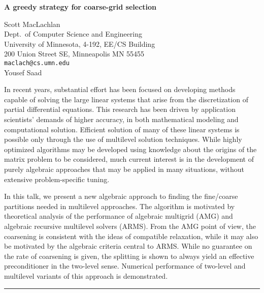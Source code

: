 \documentclass[twosided]{report}
\begin{document}
\begin{center}
{\large			%
{\bf A greedy strategy for coarse-grid selection}}

	Scott MacLachlan \\
	Dept.~of Computer Science and Engineering \\
	University of Minnesota, 4-192, EE/CS Building \\
	200 Union Street SE, Minneapolis MN 55455 \\
	{\tt maclach@cs.umn.edu} \\
	Yousef Saad
\end{center}
In recent years, substantial effort has been focused on
developing methods capable of solving the large linear
systems that arise from the discretization of partial
differential equations. This research has been driven by
application scientists' demands of higher accuracy, in both
mathematical modeling and computational solution. Efficient
solution of many of these linear systems is possible only
through the use of multilevel solution techniques. While
highly optimized algorithms may be developed using knowledge
about the origins of the matrix problem to be considered,
much current interest is in the development of purely
algebraic approaches that may be applied in many situations,
without extensive problem-specific tuning.

In this talk,
we present a new algebraic approach to finding the
fine/coarse partitions needed in multilevel approaches. The
algorithm is motivated by theoretical analysis of the
performance of algebraic multigrid (AMG) and algebraic
recursive multilevel solvers (ARMS). From the AMG point of
view, the coarsening is consistent with the ideas of
compatible relaxation, while it may also be motivated by the
algebraic criteria central to ARMS. While no guarantee on
the rate of coarsening is given, the splitting is shown to
always yield an effective preconditioner in the two-level
sense. Numerical performance of two-level and multilevel
variants of this approach is demonstrated.



	\begin{center} \rule{6in}{1pt} \end{center}
\end{document}
